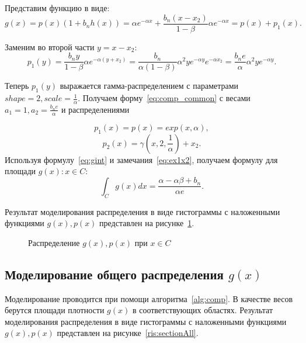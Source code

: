 \documentclass[12pt, specialist, subf, substylefile = spbu.rtx]{disser}
\begin{document}
Представим функцию в виде:
$$
g(x)=p(x)(1+b_nh(x))=\alpha e^{-\alpha x} + \frac{b_n(x-x_2)}{1-\beta}\alpha e^{-\alpha x}=p(x)+p_1(x).
$$

Заменим во второй части $y=x-x_2$:
$$
p_1(y)=\frac{b_ny}{1-\beta}\alpha e^{-\alpha (y+x_2)}=
\frac{b_n}{\alpha(1-\beta)}\alpha^2 ye^{-\alpha y}e^{-\alpha x_2}=
\frac{b_ne}{\alpha}\alpha^2 ye^{-\alpha y}.
$$

Теперь $p_1(y)$ выражается гамма-распределением с параметрами $shape=2, scale=\frac{1}{\alpha}$. Получаем форму~\eqref{eq:comp_common} с весами $a_1=1, a_2=\frac{b_ne}{\alpha}$ и распределениями 

$$
p_1(x)=p(x)=exp(x, \alpha),
$$ 
$$
p_2(x)=\gamma(x, 2, \frac{1}{\alpha})+x_2.
$$
Используя формулу~\eqref{eq:gint} и замечания~\eqref{eq:ex1x2}, получаем формулу для площади $g(x):x \in C$:
$$
\int_C g(x)dx=\frac{\alpha-\alpha\beta+b_n}{\alpha e}.
$$

Результат моделирования распределения в виде гистограммы с наложенными функциями $g(x), p(x)$ представлен на рисунке~\ref{ris:sectionC}. 

\begin{figure}[h]
\caption{Распределение $g(x), p(x)$ при $x \in C$}
\label{ris:sectionC}
\end{figure}



\subsection{Моделирование общего распределения $g(x)$}

Моделирование проводится при помощи алгоритма~\ref{alg:comp}. В качестве весов берутся площади плотности $g(x)$ в соответствующих областях. Результат моделирования распределения в виде гистограммы с наложенными функциями $g(x), p(x)$ представлен на рисунке~\ref{ris:sectionAll}. 
\end{document}
